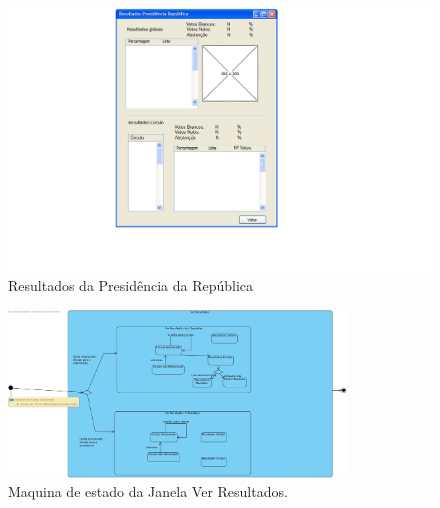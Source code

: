 \documentclass[a4paper,12pt]{report}
\begin{document}
\begin{figure}[h]
\begin{center}
	\includegraphics[width=1.3\textwidth]{media/mockup/ver_resultados_pr.png}
	 \caption{Resultados da Presidência da República}
\end{center}
\end{figure}

\begin{figure}[h]
\begin{center}
	\includegraphics[width=0.8\textwidth]{media/MaqEst/m_VerResultados.jpg}
	 \caption{Maquina de estado da Janela Ver Resultados.}
\end{center}
\end{figure}
\newpage
\clearpage
\end{document}
